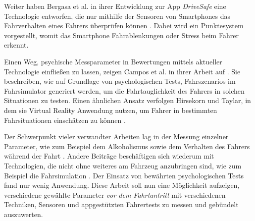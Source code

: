 Weiter haben Bergasa et al. in ihrer Entwicklung zur App \textit{DriveSafe} eine Technologie entworfen, die nur mithilfe der Sensoren von Smartphones das Fahrverhalten eines Fahrers überprüfen können \cite{drivesafe}. Dabei wird ein Punktesystem vorgestellt, womit das Smartphone Fahrablenkungen oder Stress beim Fahrer erkennt.

Einen Weg, psychische Messparameter in Bewertungen mittels aktueller Technologie einfließen zu lassen, zeigen Campos et al. in ihrer Arbeit auf \cite{drivingsimulations}. Sie beschreiben, wie auf Grundlage von psychologischen Tests, Fahrszenarios im Fahrsimulator generiert werden, um die Fahrtauglichkeit des Fahrers in solchen Situationen zu testen. Einen ähnlichen Ansatz verfolgen Hirsekorn und Taylar, in dem sie Virtual Reality Anwendung nutzen, um Fahrer in bestimmten Fahrsituationen einschätzen zu können \cite{vrapplications}.

Der Schwerpunkt vieler verwandter Arbeiten lag in der Messung einzelner Parameter, wie zum Beispiel dem Alkoholismus \cite{mobilesmarttracking,sobrietymobiletests} sowie dem Verhalten des Fahrers während der Fahrt \cite{smartphoneresearchplatform, texive, drivesafe}. Andere Beiträge beschäftigen sich wiederum mit Technologien, die nicht ohne weiteres am Fahrzeug anzubringen sind, wie zum Beispiel die Fahrsimulation \cite{drivingsimulations, interaktivefahrsimulation, vrapplications}. Der Einsatz von bewährten psychologischen Tests fand nur wenig Anwendung. Diese Arbeit soll nun eine Möglichkeit aufzeigen, verschiedene gewählte Parameter \textit{vor dem Fahrtantritt} mit verschiedenen Techniken, Sensoren und appgestützten Fahrertests zu messen und gebündelt auszuwerten.

